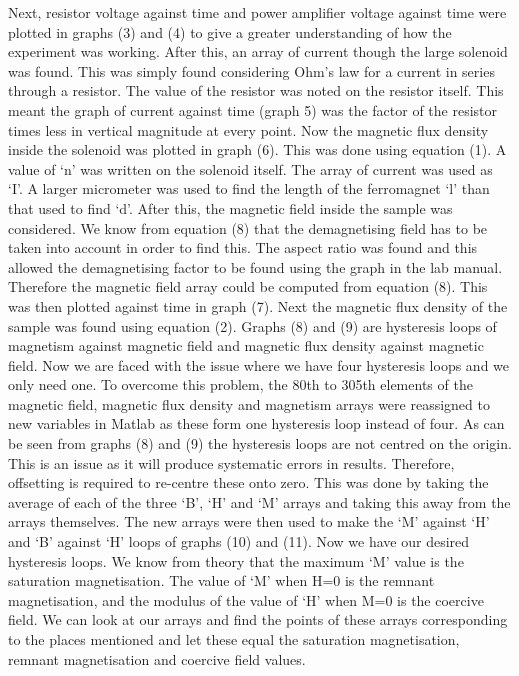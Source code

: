 \documentclass[a4paper]{article}\usepackage[english]{babel}
\begin{document}
Next, resistor voltage against time and power amplifier voltage against time were plotted in graphs (3) and (4) to give a greater understanding of how the experiment was working. After this, an array of current though the large solenoid was found. This was simply found considering Ohm’s law for a current in series through a resistor. The value of the resistor was noted on the resistor itself. This meant the graph of current against time (graph 5) was the factor of the resistor times less in vertical magnitude at every point.
Now the magnetic flux density inside the solenoid was plotted in graph (6). This was done using equation (1). A value of ‘n’ was written on the solenoid itself. The array of current was used as ‘I’. A larger micrometer was used to find the length of the ferromagnet ‘l’ than that used to find ‘d’.
After this, the magnetic field inside the sample was considered. We know from equation (8) that the demagnetising field has to be taken into account in order to find this. The aspect ratio was found and this allowed the demagnetising factor to be found using the graph in the lab manual. Therefore the magnetic field array could be computed from equation (8). This was then plotted against time in graph (7). 
Next the magnetic flux density of the sample was found using equation (2). Graphs (8) and (9) are hysteresis loops of magnetism against magnetic field and magnetic flux density against magnetic field. Now we are faced with the issue where we have four hysteresis loops and we only need one. To overcome this problem, the 80th to 305th elements of the magnetic field, magnetic flux density and magnetism arrays were reassigned to new variables in Matlab as these form one hysteresis loop instead of four. 
As can be seen from graphs (8) and (9) the hysteresis loops are not centred on the origin. This is an issue as it will produce systematic errors in results. Therefore, offsetting is required to re-centre these onto zero. This was done by taking the average of each of the three ‘B’, ‘H’ and ‘M’ arrays and taking this away from the arrays themselves. The new arrays were then used to make the ‘M’ against ‘H’ and ‘B’ against ‘H’ loops of graphs (10) and (11).
Now we have our desired hysteresis loops. We know from theory that the maximum ‘M’ value is the saturation magnetisation. The value of ‘M’ when H=0 is the remnant magnetisation, and the modulus of the value of ‘H’ when M=0 is the coercive field. We can look at our arrays and find the points of these arrays corresponding to the places mentioned and let these equal the saturation magnetisation, remnant magnetisation and coercive field values. 
\end{document}
